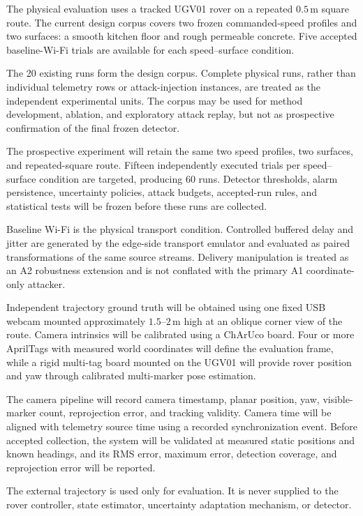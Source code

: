 \documentclass[11pt,a4paper]{article}
\begin{document}
The physical evaluation uses a tracked UGV01 rover on a repeated
$0.5\,\mathrm{m}$ square route. The current design corpus covers two frozen
commanded-speed profiles and two surfaces: a smooth kitchen floor and rough
permeable concrete. Five accepted baseline-Wi-Fi trials are available for each
speed--surface condition.

The 20 existing runs form the design corpus. Complete physical runs, rather
than individual telemetry rows or attack-injection instances, are treated as
the independent experimental units. The corpus may be used for method
development, ablation, and exploratory attack replay, but not as prospective
confirmation of the final frozen detector.

The prospective experiment will retain the same two speed profiles, two
surfaces, and repeated-square route. Fifteen independently executed trials per
speed--surface condition are targeted, producing 60 runs. Detector thresholds,
alarm persistence, uncertainty policies, attack budgets, accepted-run rules,
and statistical tests will be frozen before these runs are collected.

Baseline Wi-Fi is the physical transport condition. Controlled buffered delay
and jitter are generated by the edge-side transport emulator and evaluated as
paired transformations of the same source streams. Delivery manipulation is
treated as an A2 robustness extension and is not conflated with the primary A1
coordinate-only attacker.

Independent trajectory ground truth will be obtained using one fixed USB
webcam mounted approximately $1.5$--$2\,\mathrm{m}$ high at an oblique corner
view of the route. Camera intrinsics will be calibrated using a ChArUco board.
Four or more AprilTags with measured world coordinates will define the
evaluation frame, while a rigid multi-tag board mounted on the UGV01 will
provide rover position and yaw through calibrated multi-marker pose
estimation.

The camera pipeline will record camera timestamp, planar position, yaw,
visible-marker count, reprojection error, and tracking validity. Camera time
will be aligned with telemetry source time using a recorded synchronization
event. Before accepted collection, the system will be validated at measured
static positions and known headings, and its RMS error, maximum error,
detection coverage, and reprojection error will be reported.

The external trajectory is used only for evaluation. It is never supplied to
the rover controller, state estimator, uncertainty adaptation mechanism, or
detector.
\end{document}
